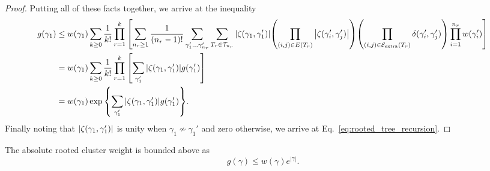 \begin{proof}
    Putting all of these facts together, we arrive at the inequality
    \begin{equation}
        \begin{split}
            g(\gamma_1) &\leq w(\gamma_1) \sum_{k \geq 0} \frac{1}{k!} \prod_{r = 1}^k \qty[ \sum_{n_r \geq 1} \frac{1}{(n_r - 1)!} \sum_{\gamma_1' \ldots \gamma_{n_r}'} \sum_{T_r \in \mathcal{T}_{n_r}} \abs{\zeta(\gamma_1, \gamma_1')} \qty( \prod_{(i, j) \in E(T_r)} \abs{\zeta(\gamma_i', \gamma_j')} ) \qty( \prod_{(i, j) \in \mathcal{E}_{\text{extra}}(T_r)} \delta(\gamma_i', \gamma_j')  ) \prod_{i = 1}^{n_r} w(\gamma_i') ] \\
            &= w(\gamma_1) \sum_{k \geq 0} \frac{1}{k!} \prod_{r = 1}^k \qty[ \sum_{\gamma_1'} \abs{\zeta(\gamma_1, \gamma_1')} g(\gamma_1') ] \\
            &= w(\gamma_1) \exp \qty{ \sum_{\gamma_1'} \abs{\zeta(\gamma_1, \gamma_1')} g(\gamma_1') }.
        \end{split}
    \end{equation}
    Finally noting that $\abs{\zeta(\gamma_1, \gamma_1')}$ is unity when $\gamma_1 \nsim \gamma_1'$ and zero otherwise, we arrive at Eq.~\eqref{eq:rooted_tree_recursion}.
    

\end{proof}


\begin{lemma}
\label{cor:absrootedbound}
    The absolute rooted cluster weight is bounded above as 
    \begin{equation}
    \label{eq:absolute_rooted_bound}
        g(\gamma) \leq w(\gamma) e^{|\gamma|} .
    \end{equation}
\end{lemma}

